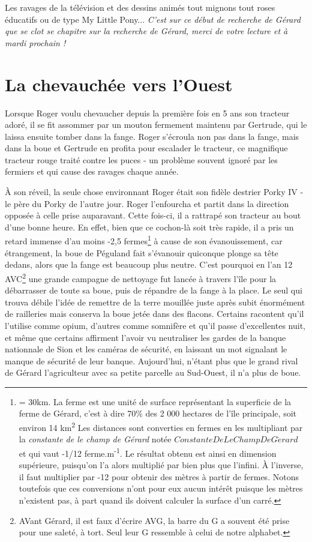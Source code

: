 \documentclass[a5paper, 10pt, twoside]{book}
\begin{document}
Les ravages de la télévision et des dessins animés tout mignons tout roses éducatifs ou de type My Little Pony...
\vfill
\emph{C'est sur ce début de recherche de Gérard que se clot se chapitre sur la recherche de Gérard, merci de votre lecture et à mardi prochain !}

\chapter{La chevauchée vers l'Ouest}
Lorsque Roger voulu chevaucher depuis la première fois en 5 ans son tracteur adoré, il se fit assommer par un mouton fermement maintenu par Gertrude, qui le laissa ensuite tomber dans la fange. Roger s'écroula non pas dans la fange, mais dans la boue et Gertrude en profita pour escalader le tracteur, ce magnifique tracteur rouge traité contre les puces - un problème souvent ignoré par les fermiers et qui cause des ravages chaque année.

À son réveil, la seule chose environnant Roger était son fidèle destrier Porky IV - le père du Porky de l'autre jour. Roger l'enfourcha et partit dans la direction opposée à celle prise auparavant. Cette fois-ci, il a rattrapé son tracteur au bout d'une bonne heure. En effet, bien que ce cochon-là soit très rapide, il a pris un retard immense d'au moins -2,5 fermes\footnote{= 30km. La ferme est une unité de surface représentant la superficie de la ferme de Gérard, c'est à dire 70\% des 2 000 hectares de l'île principale, soit environ 14 km\textsuperscript{2} Les distances sont converties en fermes en les multipliant par la \emph{constante de le champ de Gérard} notée $ConstanteDeLeChampDeG\acute{e}rard$ et qui vaut -1/12 ferme.m\textsuperscript{-1}. Le résultat obtenu est ainsi en dimension supérieure, puisqu'on l'a alors multiplié par bien plus que l'infini. À l'inverse, il faut multiplier par -12 pour obtenir des mètres à partir de fermes. Notons toutefois que ces conversions n'ont pour eux aucun intérêt puisque les mètres n'existent pas, à part quand ils doivent calculer la surface d'un carré.} à cause de son évanouissement, car étrangement, la boue de Péguland fait s'évanouir quiconque plonge sa tête dedans, alors que la fange est beaucoup plus neutre. C'est pourquoi en l'an 12 AVC\footnote{AVant Gérard, il est faux d'écrire AVG, la barre du G a souvent été prise pour une saleté, à tort. Seul leur G ressemble à celui de notre alphabet.} une grande campagne de nettoyage fut lancée à travers l'île pour la débarrasser de toute sa boue, puis de répandre de la fange à la place. Le seul qui trouva débile l'idée de remettre de la terre mouillée juste après subit énormément de railleries mais conserva la boue jetée dans des flacons. Certains racontent qu'il l'utilise comme opium, d'autres comme somnifère et qu'il passe d'excellentes nuit, et même que certains affirment l'avoir vu neutraliser les gardes de la banque nationnale de Sion et les caméras de sécurité, en laissant un mot signalant le manque de sécurité de leur banque. Aujourd'hui, n'étant plus que le grand rival de Gérard l'agriculteur avec sa petite parcelle au Sud-Ouest, il n'a plus de boue.
\end{document}
